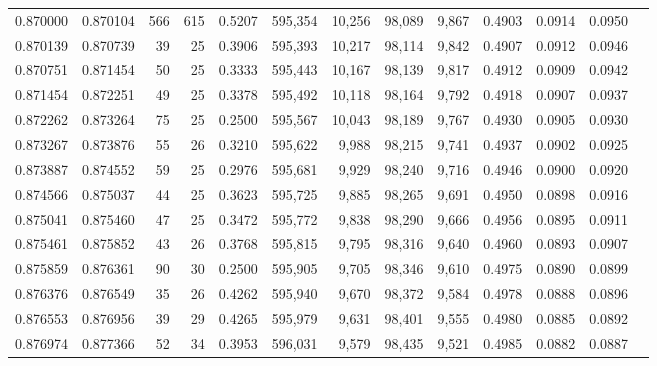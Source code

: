 \begin{tabular}{rrrrrrrrrrrrr}
0.870000 & 0.870104 &   566 & 615 &                                     0.5207 & 595,354 &  10,256 &  98,089 &   9,867 & 0.4903 & 0.0914 & 0.0950 \\
0.870139 & 0.870739 &    39 &  25 &                                     0.3906 & 595,393 &  10,217 &  98,114 &   9,842 & 0.4907 & 0.0912 & 0.0946 \\
0.870751 & 0.871454 &    50 &  25 &                                     0.3333 & 595,443 &  10,167 &  98,139 &   9,817 & 0.4912 & 0.0909 & 0.0942 \\
0.871454 & 0.872251 &    49 &  25 &                                     0.3378 & 595,492 &  10,118 &  98,164 &   9,792 & 0.4918 & 0.0907 & 0.0937 \\
0.872262 & 0.873264 &    75 &  25 &                                     0.2500 & 595,567 &  10,043 &  98,189 &   9,767 & 0.4930 & 0.0905 & 0.0930 \\
0.873267 & 0.873876 &    55 &  26 &                                     0.3210 & 595,622 &   9,988 &  98,215 &   9,741 & 0.4937 & 0.0902 & 0.0925 \\
0.873887 & 0.874552 &    59 &  25 &                                     0.2976 & 595,681 &   9,929 &  98,240 &   9,716 & 0.4946 & 0.0900 & 0.0920 \\
0.874566 & 0.875037 &    44 &  25 &                                     0.3623 & 595,725 &   9,885 &  98,265 &   9,691 & 0.4950 & 0.0898 & 0.0916 \\
0.875041 & 0.875460 &    47 &  25 &                                     0.3472 & 595,772 &   9,838 &  98,290 &   9,666 & 0.4956 & 0.0895 & 0.0911 \\
0.875461 & 0.875852 &    43 &  26 &                                     0.3768 & 595,815 &   9,795 &  98,316 &   9,640 & 0.4960 & 0.0893 & 0.0907 \\
0.875859 & 0.876361 &    90 &  30 &                                     0.2500 & 595,905 &   9,705 &  98,346 &   9,610 & 0.4975 & 0.0890 & 0.0899 \\
0.876376 & 0.876549 &    35 &  26 &                                     0.4262 & 595,940 &   9,670 &  98,372 &   9,584 & 0.4978 & 0.0888 & 0.0896 \\
0.876553 & 0.876956 &    39 &  29 &                                     0.4265 & 595,979 &   9,631 &  98,401 &   9,555 & 0.4980 & 0.0885 & 0.0892 \\
0.876974 & 0.877366 &    52 &  34 &                                     0.3953 & 596,031 &   9,579 &  98,435 &   9,521 & 0.4985 & 0.0882 & 0.0887 \\

\end{tabular}
